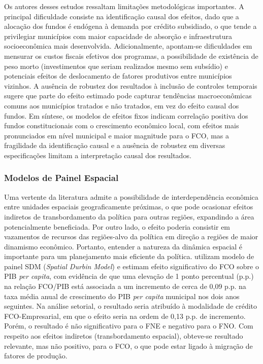 Os autores desses estudos ressaltam limitações metodológicas importantes. A principal dificuldade consiste na identificação causal dos efeitos, dado que a alocação dos fundos é endógena à demanda por crédito subsidiado, o que tende a privilegiar municípios com maior capacidade de absorção e infraestrutura socioeconômica mais desenvolvida. Adicionalmente, apontam-se dificuldades em mensurar os custos fiscais efetivos dos programas, a possibilidade de existência de peso morto (investimentos que seriam realizados mesmo sem subsídio) e potenciais efeitos de deslocamento de fatores produtivos entre municípios vizinhos. A ausência de robustez dos resultados à inclusão de controles temporais sugere que parte do efeito estimado pode capturar tendências macroeconômicas comuns aos municípios tratados e não tratados, em vez do efeito causal dos fundos. Em síntese, os modelos de efeitos fixos indicam correlação positiva dos fundos constitucionais com o crescimento econômico local, com efeitos mais pronunciados em nível municipal e maior magnitude para o FCO, mas a fragilidade da identificação causal e a ausência de robustez em diversas especificações limitam a interpretação causal dos resultados.

\subsubsection{Modelos de Painel Espacial}

Uma vertente da literatura admite a possibilidade de interdependência econômica entre unidades espaciais geograficamente próximas, o que pode ocasionar efeitos indiretos de transbordamento da política para outras regiões, expandindo a área potencialmente beneficiada. Por outro lado, o efeito poderia consistir em vazamentos de recursos das regiões-alvo da política em direção a regiões de maior dinamismo econômico. Portanto, entender a natureza da dinâmica espacial é importante para um planejamento mais eficiente da política.  utilizam modelo de painel SDM (\textit{Spatial Durbin Model}) e estimam efeito significativo do FCO sobre o PIB \textit{per capita}, com evidência de que uma elevação de 1 ponto percentual (p.p.) na relação FCO/PIB está associada a um incremento de cerca de 0,09 p.p. na taxa média anual de crescimento do PIB \textit{per capita} municipal nos dois anos seguintes. Na análise setorial, o resultado seria atribuído à modalidade de crédito FCO-Empresarial, em que o efeito seria na ordem de 0,13 p.p. de incremento. Porém, o resultado é não significativo para o FNE e negativo para o FNO. Com respeito aos efeitos indiretos (transbordamento espacial), obteve-se resultado relevante, mas não positivo, para o FCO, o que pode estar ligado à migração de fatores de produção.

